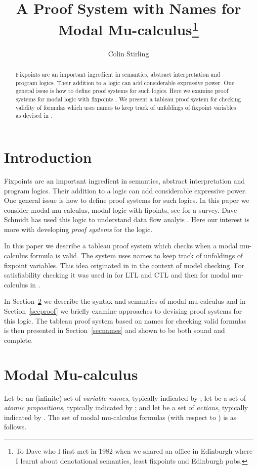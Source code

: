 \documentclass[copyright,creativecommons]{eptcs}
\title{A  Proof System with Names for Modal Mu-calculus\footnote{To Dave who 
I first met in 1982 when we shared 
an office in Edinburgh where I learnt about denotational
semantics, least fixpoints and Edinburgh pubs.}}
\author{
    Colin Stirling
    \institute{School of Informatics\\ University of Edinburgh}\\
    \email{cps@inf.ed.ac.uk}}
\def\w{\emph}
\begin{document}
\maketitle





\begin{abstract}
Fixpoints are an important ingredient in semantics, abstract interpretation
and program logics. Their addition to a logic
can add considerable expressive power.
One general  issue is how to define 
proof systems for such logics. Here we examine proof systems for
modal logic with fixpoints \cite{Koz83}. We  present a  tableau proof system
for checking validity of formulas 
which uses names to keep track of unfoldings of fixpoint variables 
as devised in  \cite{Ju09}.
\end{abstract}

\section{Introduction}
Fixpoints are an important ingredient in semantics, abstract interpretation
and program logics. Their addition to a logic
can add considerable expressive power.
One general  issue is how to define 
proof systems for such logics. 
In this paper we consider modal mu-calculus, modal logic with fipoints,
see \cite{BS07} for a survey. 
Dave Schmidt  has used this logic to understand data flow analyis
\cite{Sch}.
Here our interest is more with developing \w{proof systems} for the logic. 

In this paper we describe a tableau proof system which checks when
a modal mu-calculus formula is valid. The system 
uses names to keep track of unfoldings of fixpoint variables. 
This idea originated in \cite{StW9} in the context of  model checking. 
For satisfiability
checking it  was used in \cite{LS01} for LTL and CTL and then for
modal mu-calculus  in \cite{Ju09}. 

In Section~\ref{secmodal} we describe the syntax and semantics of 
modal mu-calculus and in Section~\ref{secproof} we briefly examine 
approaches to  devising proof systems for this logic. The tableau proof
system based on names for checking  valid formulas is then presented in
Section~\ref{secnames} and shown to be both sound and complete. 


\section{Modal Mu-calculus}
\label{secmodal}
Let  be an (infinite) set of \w{variable names}, typically
indicated by ; let  be a set of \w{atomic
propositions}, typically indicated by ; and let  be a set
of \w{actions}, typically indicated by . The set of modal
mu-calculus formulas  (with respect to ) is as 
follows.
\end{document}
